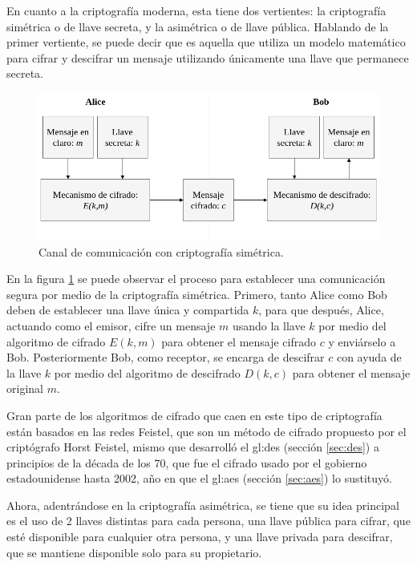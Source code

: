 En cuanto a la criptografía moderna, esta tiene dos vertientes: la
criptografía simétrica o de llave secreta, y la asimétrica o de llave
pública. Hablando de la primer vertiente, se puede decir que es aquella
que utiliza un modelo matemático para cifrar y descifrar un mensaje
utilizando únicamente una llave que permanece secreta.

\begin{figure}
  \begin{center}
    \includegraphics[width=0.8\linewidth]{diagramas/cripto_simetrica.png}
    \caption{Canal de comunicación con criptografía simétrica.}
    \label{cripto_simetrica}
  \end{center}
\end{figure}

En la figura \ref{cripto_simetrica} se puede observar el proceso para
establecer una comunicación segura por medio de la criptografía simétrica.
Primero, tanto Alice como Bob deben de establecer una llave única y
compartida $k$, para que después, Alice, actuando como el emisor, cifre un
mensaje $m$ usando la llave $k$ por medio del algoritmo de cifrado $E(k,m)$
para obtener el mensaje cifrado $c$ y enviárselo a Bob. Posteriormente Bob,
como receptor, se encarga de descifrar $c$ con ayuda de la llave $k$ por
medio del algoritmo de descifrado $D(k,c)$ para obtener el mensaje original
$m$.

Gran parte de los algoritmos de cifrado que caen en este tipo de criptografía
están basados en las redes Feistel, que son un método de cifrado propuesto
por el criptógrafo Horst Feistel, mismo que desarrolló el \gls{gl:des}
(sección \ref{sec:des}) a principios de la década de los 70, que fue el
cifrado usado por el gobierno estadounidense hasta 2002, año en que el
\gls{gl:aes} (sección \ref{sec:aes}) lo sustituyó.

Ahora, adentrándose en la criptografía asimétrica, se tiene que su idea
principal es el uso de 2 llaves distintas para cada persona, una llave
pública para cifrar, que esté disponible para cualquier otra persona, y una
llave privada para descifrar, que se mantiene disponible solo para su
propietario.

